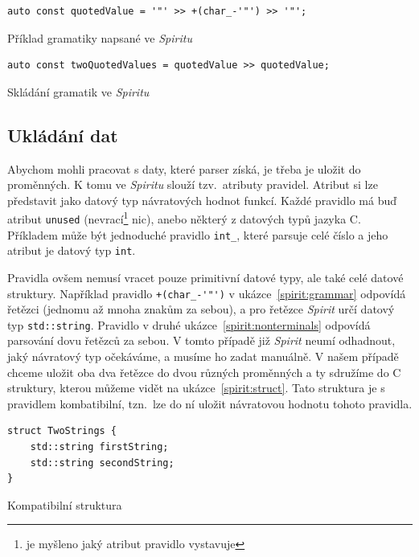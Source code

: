 \documentclass[thesis=B,czech,hidelinks]{FITthesis}[2019/03/06]
\newcommand{\Rplus}{\protect\hspace{-.1em}\protect\raisebox{.35ex}{\smaller{\smaller\textbf{+}}}}
\newcommand{\Cpp}{\mbox{C\Rplus\Rplus}\xspace}
\begin{document}
\begin{listing}
\begin{verbatim}
auto const quotedValue = '"' >> +(char_-'"') >> '"';
\end{verbatim}
\caption{Příklad gramatiky napsané ve \textit{Spiritu}}\label{spirit:grammar}
\end{listing}

\begin{listing}
\begin{verbatim}
auto const twoQuotedValues = quotedValue >> quotedValue;
\end{verbatim}
\caption{Skládání gramatik ve \textit{Spiritu}}\label{spirit:nonterminals}
\end{listing}


\subsection{Ukládání dat}
Abychom mohli pracovat s daty, které parser získá, je třeba je uložit do proměnných. K tomu ve \textit{Spiritu} slouží tzv.\ atributy pravidel. Atribut si lze představit jako datový typ návratových hodnot funkcí. Každé pravidlo má buď atribut \texttt{unused} (nevrací\footnote{ je myšleno jaký atribut pravidlo vystavuje} nic), anebo některý z datových typů jazyka \Cpp{}. Příkladem může být jednoduché pravidlo \verb¨int_¨, které parsuje celé číslo a jeho atribut je datový typ \texttt{int}.

Pravidla ovšem nemusí vracet pouze primitivní datové typy, ale také celé datové struktury. Například pravidlo \verb¨+(char_-'"')¨ v ukázce~\ref{spirit:grammar} odpovídá řetězci (jednomu až mnoha znakům za sebou), a pro řetězce \textit{Spirit} určí datový typ \texttt{std::string}. Pravidlo v druhé ukázce~\ref{spirit:nonterminals} odpovídá parsování dovu řetězců za sebou. V tomto případě již \textit{Spirit} neumí odhadnout, jaký návratový typ očekáváme, a musíme ho zadat manuálně. V našem případě chceme uložit oba dva řetězce do dvou různých proměnných a ty sdružíme do \Cpp{} struktury, kterou můžeme vidět na ukázce~\ref{spirit:struct}. Tato struktura je s pravidlem kombatibilní, tzn.\ lze do ní uložit návratovou hodnotu tohoto pravidla.

\begin{listing}
\begin{verbatim}
struct TwoStrings {
    std::string firstString;
    std::string secondString;
}
\end{verbatim}
\caption{Kompatibilní struktura}\label{spirit:struct}
\end{listing}
\end{document}
